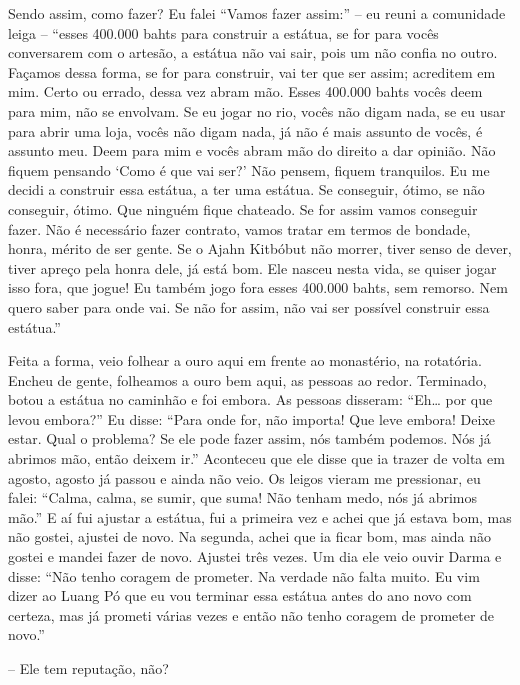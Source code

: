 Sendo assim, como fazer? Eu falei “Vamos fazer assim:” – eu reuni a
comunidade leiga – “esses 400.000 bahts para construir a estátua, se
for para vocês conversarem com o artesão, a estátua não vai sair, pois
um não confia no outro. Façamos dessa forma, se for para construir, vai
ter que ser assim; acreditem em mim. Certo ou errado, dessa vez abram
mão. Esses 400.000 bahts vocês deem para mim, não se envolvam. Se eu
jogar no rio, vocês não digam nada, se eu usar para abrir uma loja,
vocês não digam nada, já não é mais assunto de vocês, é assunto meu.
Deem para mim e vocês abram mão do direito a dar opinião. Não fiquem
pensando ‘Como é que vai ser?’ Não pensem, fiquem tranquilos. Eu me
decidi a construir essa estátua, a ter uma estátua. Se conseguir,
ótimo, se não conseguir, ótimo. Que ninguém fique chateado. Se for
assim vamos conseguir fazer. Não é necessário fazer contrato, vamos
tratar em termos de bondade, honra, mérito de ser gente. Se o Ajahn
Kitbóbut não morrer, tiver senso de dever, tiver apreço pela honra
dele, já está bom. Ele nasceu nesta vida, se quiser jogar isso fora,
que jogue! Eu também jogo fora esses 400.000 bahts, sem remorso. Nem
quero saber para onde vai. Se não for assim, não vai ser possível
construir essa estátua.”

Feita a forma, veio folhear a ouro aqui em frente ao monastério, na
rotatória. Encheu de gente, folheamos a ouro bem aqui, as pessoas ao
redor. Terminado, botou a estátua no caminhão e foi embora. As pessoas
disseram: “Eh\ldots{} por que levou embora?” Eu disse: “Para onde for, não
importa! Que leve embora! Deixe estar. Qual o problema? Se ele pode
fazer assim, nós também podemos. Nós já abrimos mão, então deixem ir.”
Aconteceu que ele disse que ia trazer de volta em agosto, agosto já
passou e ainda não veio. Os leigos vieram me pressionar, eu falei:
“Calma, calma, se sumir, que suma! Não tenham medo, nós já abrimos
mão.” E aí fui ajustar a estátua, fui a primeira vez e achei que já
estava bom, mas não gostei, ajustei de novo. Na segunda, achei que ia
ficar bom, mas ainda não gostei e mandei fazer de novo. Ajustei três
vezes. Um dia ele veio ouvir Darma e disse: “Não tenho coragem de
prometer. Na verdade não falta muito. Eu vim dizer ao Luang Pó que eu
vou terminar essa estátua antes do ano novo com certeza, mas já prometi
várias vezes e então não tenho coragem de prometer de novo.”

-- Ele tem reputação, não?

